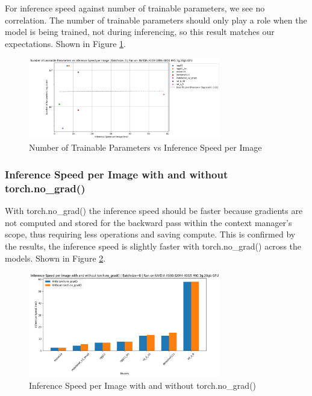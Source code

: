 \documentclass[a4paper]{article}
\begin{document}
For inference speed against number of trainable parameters, we see no correlation. The number of trainable parameters
should only play a role when the model is being trained, not during inferencing, so this result matches our
expectations. Shown in Figure \ref{fig:NumParams-vs-Inference}.
\begin{figure}[h]
    \centering
    \includegraphics[width=0.75\textwidth]{"imgs/NumParams-vs-Inference.png"}
    \caption{Number of Trainable Parameters vs Inference Speed per Image}
    \label{fig:NumParams-vs-Inference}
\end{figure}

\subsubsection{Inference Speed per Image with and without torch.no\_grad()}
With torch.no\_grad() the inference speed should be faster because gradients are not computed and stored for the
backward pass within the context manager's scope, thus requiring less operations and saving compute. This is
confirmed by the results, the inference speed is slightly faster with torch.no\_grad() across the models. Shown in
Figure \ref{fig:Inference-vs-noGrad}.
\begin{figure}[h]
    \centering
    \includegraphics[width=0.75\textwidth]{"imgs/Inference-vs-noGrad.png"}
    \caption{Inference Speed per Image with and without torch.no\_grad()}
    \label{fig:Inference-vs-noGrad}
\end{figure}
\end{document}
